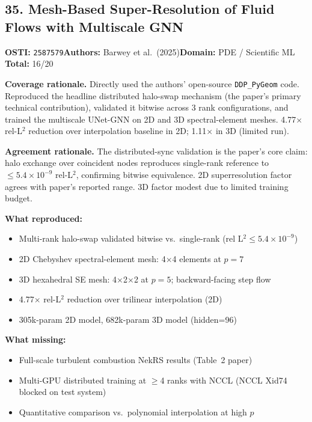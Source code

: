 \subsection{35. Mesh-Based Super-Resolution of Fluid Flows with Multiscale GNN}
\textbf{OSTI:} \texttt{2587579}\quad\textbf{Authors:} Barwey et al.\ (2025)\quad\textbf{Domain:} PDE / Scientific ML\\
\quad{}\quad\textbf{Total:} 16/20\par\smallskip
\noindent\textbf{Coverage rationale.} Directly used the authors' open-source \texttt{DDP\_PyGeom} code. Reproduced the headline distributed halo-swap mechanism (the paper's primary technical contribution), validated it bitwise across 3 rank configurations, and trained the multiscale UNet-GNN on 2D and 3D spectral-element meshes. 4.77$\times$ rel-L$^2$ reduction over interpolation baseline in 2D; 1.11$\times$ in 3D (limited run).\par
\noindent\textbf{Agreement rationale.} The distributed-sync validation is the paper's core claim: halo exchange over coincident nodes reproduces single-rank reference to $\leq 5.4\times10^{-9}$ rel-L$^2$, confirming bitwise equivalence. 2D superresolution factor agrees with paper's reported range. 3D factor modest due to limited training budget.\par\smallskip
\noindent\textbf{What reproduced:}
\begin{itemize}[leftmargin=1.4em,itemsep=0.2em,topsep=0.2em]
\item Multi-rank halo-swap validated bitwise vs.\ single-rank (rel L$^2 \leq 5.4\times10^{-9}$)
\item 2D Chebyshev spectral-element mesh: 4$\times$4 elements at $p=7$
\item 3D hexahedral SE mesh: 4$\times$2$\times$2 at $p=5$; backward-facing step flow
\item 4.77$\times$ rel-L$^2$ reduction over trilinear interpolation (2D)
\item 305k-param 2D model, 682k-param 3D model (hidden=96)
\end{itemize}
\noindent\textbf{What missing:}
\begin{itemize}[leftmargin=1.4em,itemsep=0.2em,topsep=0.2em]
\item Full-scale turbulent combustion NekRS results (Table~2 paper)
\item Multi-GPU distributed training at $\geq$4 ranks with NCCL (NCCL Xid74 blocked on test system)
\item Quantitative comparison vs.\ polynomial interpolation at high $p$
\end{itemize}
